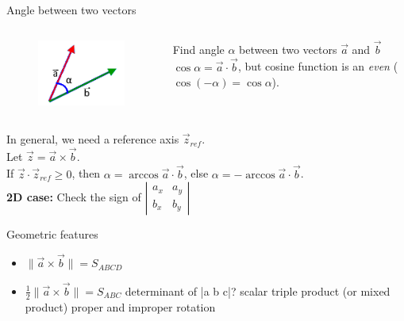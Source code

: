 \documentclass[10pt]{beamer}
\newcommand*{\vectpr}[2]{ \vec{#1} \times \vec{#2} }
\newcommand*{\dotpr}[2]{ \vec{#1} \cdot \vec{#2} }
\begin{document}
\begin{frame}[t]{Angle between two vectors}
  \begin{columns}[t]
      \begin{figure}[!htb]
	\centering
	\includegraphics[width = 0.6 \linewidth ]{dot_product.png}
      \end{figure}
      \begin{tcolorbox}[colback=black!5,colframe=magenta!75!black,title=Problem]
	Find angle $\alpha$ between two vectors $\vec{a}$ and $\vec{b}$
	\tcblower
	\textbf{$\cos{\alpha} = \dotpr{a}{b}$}, but cosine function is an \textit{even} ($\cos{(-\alpha)} = \cos{\alpha}$).
      \end{tcolorbox} 
    \end{columns}
 
      \begin{tcolorbox}[colback=black!5,colframe=yellow!75!black,title=Solution]	
	In general, we need a reference axis $\vec{z}_{ref}$. \\ 
	Let $\vec{z} = \vectpr{a}{b}$. \\ 
	If $\vec{z} \cdot  \vec{z}_{ref} \ge 0$, then $\alpha = \arccos{\dotpr{a}{b}}$, else $\alpha = - \arccos{\dotpr{a}{b}}$. \\
	\textbf{2D case:} Check the sign of $\left| \begin{smallmatrix}
	                                     a_x & a_y \\
	                                     b_x & b_y 
	                                  \end{smallmatrix} 
	                           \right|$

      \end{tcolorbox} 
 
\end{frame}

\begin{frame}[t]{Geometric features}
 \begin{itemize}
  \item $\|\vectpr{a}{b} \| = S_{ABCD}$
  \item $ \frac{1}{2} \|\vectpr{a}{b} \| = S_{ABC}$
  determinant of |a b c|?
  scalar triple product (or mixed product)
  proper and improper rotation
 \end{itemize}

\end{frame}
\end{document}
